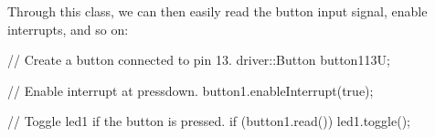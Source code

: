 \noindent Through this class, we can then easily read the button input signal, enable interrupts,
and so on:

\begin{cppcode}
// Create a button connected to pin 13.
driver::Button button1{13U};

// Enable interrupt at pressdown.
button1.enableInterrupt(true);

// Toggle led1 if the button is pressed.
if (button1.read()) { led1.toggle(); }
\end{cppcode}
